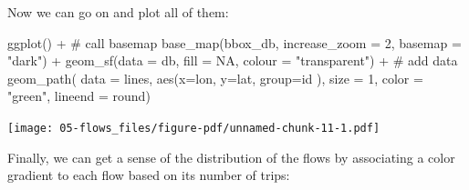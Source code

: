 \documentclass[
  letterpaper,
  DIV=11,
  numbers=noendperiod,
  oneside]{scrreprt}
\newenvironment{Shaded}{\begin{snugshade}}{\end{snugshade}}
\newcommand{\AttributeTok}[1]{\textcolor[rgb]{0.40,0.45,0.13}{#1}}
\newcommand{\CommentTok}[1]{\textcolor[rgb]{0.37,0.37,0.37}{#1}}
\newcommand{\ConstantTok}[1]{\textcolor[rgb]{0.56,0.35,0.01}{#1}}
\newcommand{\DecValTok}[1]{\textcolor[rgb]{0.68,0.00,0.00}{#1}}
\newcommand{\FunctionTok}[1]{\textcolor[rgb]{0.28,0.35,0.67}{#1}}
\newcommand{\NormalTok}[1]{\textcolor[rgb]{0.00,0.23,0.31}{#1}}
\newcommand{\SpecialCharTok}[1]{\textcolor[rgb]{0.37,0.37,0.37}{#1}}
\newcommand{\StringTok}[1]{\textcolor[rgb]{0.13,0.47,0.30}{#1}}
\begin{document}
Now we can go on and plot all of them:

\begin{Shaded}
\begin{Highlighting}[]
\FunctionTok{ggplot}\NormalTok{() }\SpecialCharTok{+}
  \CommentTok{\# call basemap}
  \FunctionTok{base\_map}\NormalTok{(bbox\_db, }\AttributeTok{increase\_zoom =} \DecValTok{2}\NormalTok{, }\AttributeTok{basemap =} \StringTok{"dark"}\NormalTok{) }\SpecialCharTok{+}
  \FunctionTok{geom\_sf}\NormalTok{(}\AttributeTok{data =}\NormalTok{ db, }\AttributeTok{fill =} \ConstantTok{NA}\NormalTok{, }\AttributeTok{colour =} \StringTok{"transparent"}\NormalTok{) }\SpecialCharTok{+}
  \CommentTok{\# add data}
  \FunctionTok{geom\_path}\NormalTok{( }\AttributeTok{data =}\NormalTok{ lines, }
             \FunctionTok{aes}\NormalTok{(}\AttributeTok{x=}\NormalTok{lon, }\AttributeTok{y=}\NormalTok{lat, }
                 \AttributeTok{group=}\NormalTok{id}
\NormalTok{                 ), }
             \AttributeTok{size =} \DecValTok{1}\NormalTok{,}
             \AttributeTok{color =} \StringTok{"green"}\NormalTok{,}
             \AttributeTok{lineend =} \StringTok{\textquotesingle{}round\textquotesingle{}}\NormalTok{)}
\end{Highlighting}
\end{Shaded}

\texttt{[image: 05-flows\_files/figure-pdf/unnamed-chunk-11-1.pdf]}

Finally, we can get a sense of the distribution of the flows by
associating a color gradient to each flow based on its number of trips:
\end{document}
